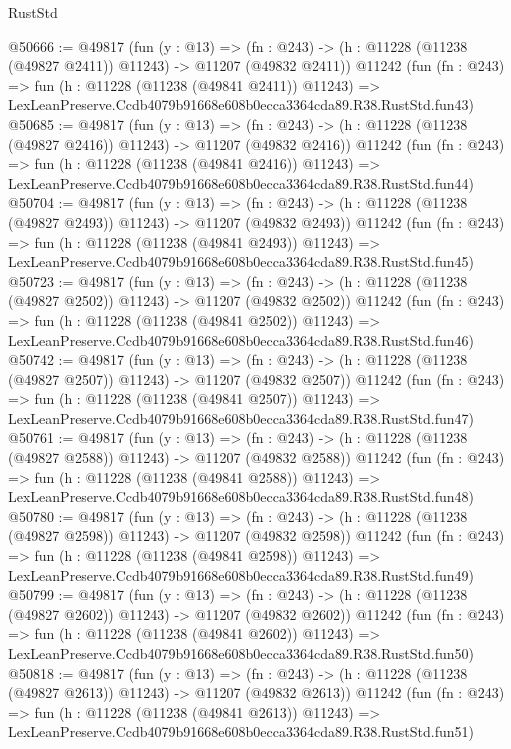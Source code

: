 \begin{lexlean}{RustStd}
\begin{coremodule}
@50666 := @49817
    (fun (y : @13) =>
    (fn : @243) -> (h : @11228 (@11238 (@49827 @2411)) @11243) -> @11207 (@49832 @2411))
    @11242
    (fun (fn : @243) =>
    fun (h : @11228 (@11238 (@49841 @2411)) @11243) =>
    LexLeanPreserve.Ccdb4079b91668e608b0ecca3364cda89.R38.RustStd.fun43)
@50685 := @49817
    (fun (y : @13) =>
    (fn : @243) -> (h : @11228 (@11238 (@49827 @2416)) @11243) -> @11207 (@49832 @2416))
    @11242
    (fun (fn : @243) =>
    fun (h : @11228 (@11238 (@49841 @2416)) @11243) =>
    LexLeanPreserve.Ccdb4079b91668e608b0ecca3364cda89.R38.RustStd.fun44)
@50704 := @49817
    (fun (y : @13) =>
    (fn : @243) -> (h : @11228 (@11238 (@49827 @2493)) @11243) -> @11207 (@49832 @2493))
    @11242
    (fun (fn : @243) =>
    fun (h : @11228 (@11238 (@49841 @2493)) @11243) =>
    LexLeanPreserve.Ccdb4079b91668e608b0ecca3364cda89.R38.RustStd.fun45)
@50723 := @49817
    (fun (y : @13) =>
    (fn : @243) -> (h : @11228 (@11238 (@49827 @2502)) @11243) -> @11207 (@49832 @2502))
    @11242
    (fun (fn : @243) =>
    fun (h : @11228 (@11238 (@49841 @2502)) @11243) =>
    LexLeanPreserve.Ccdb4079b91668e608b0ecca3364cda89.R38.RustStd.fun46)
@50742 := @49817
    (fun (y : @13) =>
    (fn : @243) -> (h : @11228 (@11238 (@49827 @2507)) @11243) -> @11207 (@49832 @2507))
    @11242
    (fun (fn : @243) =>
    fun (h : @11228 (@11238 (@49841 @2507)) @11243) =>
    LexLeanPreserve.Ccdb4079b91668e608b0ecca3364cda89.R38.RustStd.fun47)
@50761 := @49817
    (fun (y : @13) =>
    (fn : @243) -> (h : @11228 (@11238 (@49827 @2588)) @11243) -> @11207 (@49832 @2588))
    @11242
    (fun (fn : @243) =>
    fun (h : @11228 (@11238 (@49841 @2588)) @11243) =>
    LexLeanPreserve.Ccdb4079b91668e608b0ecca3364cda89.R38.RustStd.fun48)
@50780 := @49817
    (fun (y : @13) =>
    (fn : @243) -> (h : @11228 (@11238 (@49827 @2598)) @11243) -> @11207 (@49832 @2598))
    @11242
    (fun (fn : @243) =>
    fun (h : @11228 (@11238 (@49841 @2598)) @11243) =>
    LexLeanPreserve.Ccdb4079b91668e608b0ecca3364cda89.R38.RustStd.fun49)
@50799 := @49817
    (fun (y : @13) =>
    (fn : @243) -> (h : @11228 (@11238 (@49827 @2602)) @11243) -> @11207 (@49832 @2602))
    @11242
    (fun (fn : @243) =>
    fun (h : @11228 (@11238 (@49841 @2602)) @11243) =>
    LexLeanPreserve.Ccdb4079b91668e608b0ecca3364cda89.R38.RustStd.fun50)
@50818 := @49817
    (fun (y : @13) =>
    (fn : @243) -> (h : @11228 (@11238 (@49827 @2613)) @11243) -> @11207 (@49832 @2613))
    @11242
    (fun (fn : @243) =>
    fun (h : @11228 (@11238 (@49841 @2613)) @11243) =>
    LexLeanPreserve.Ccdb4079b91668e608b0ecca3364cda89.R38.RustStd.fun51)

\end{coremodule}
\end{lexlean}
